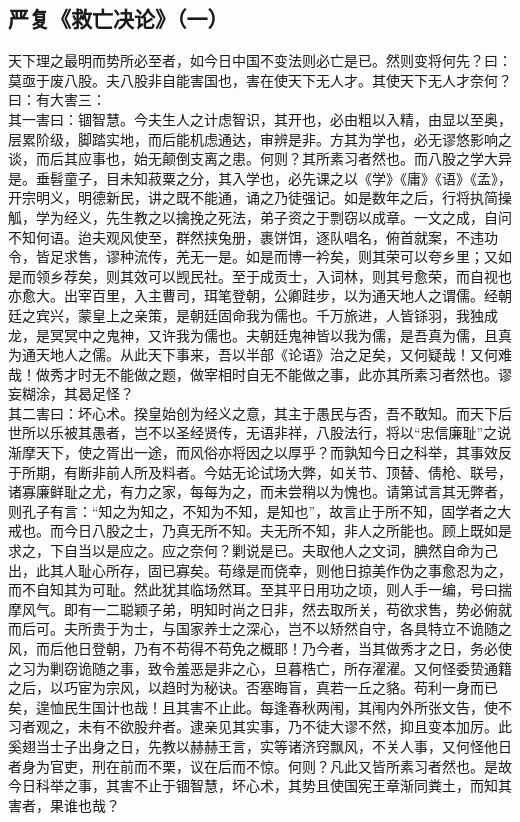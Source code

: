 \documentclass[letterpaper, 12pt]{article}
\begin{document}
\begin{multicols}{2}
\section{严复《救亡决论》（一）}
天下理之最明而势所必至者，如今日中国不变法则必亡是已。然则变将何先？曰：莫亟于废八股。夫八股非自能害国也，害在使天下无人才。其使天下无人才奈何？曰：有大害三：\\

其一害曰：锢智慧。今夫生人之计虑智识，其开也，必由粗以入精，由显以至奥，层累阶级，脚踏实地，而后能机虑通达，审辨是非。方其为学也，必无谬悠影响之谈，而后其应事也，始无颠倒支离之患。何则？其所素习者然也。而八股之学大异是。垂髫童子，目未知菽粟之分，其入学也，必先课之以《学》《庸》《语》《孟》，开宗明义，明德新民，讲之既不能通，诵之乃徒强记。如是数年之后，行将执简操觚，学为经义，先生教之以擒挽之死法，弟子资之于剽窃以成章。一文之成，自问不知何语。迨夫观风使至，群然挟兔册，裹饼饵，逐队唱名，俯首就案，不违功令，皆足求售，谬种流传，羌无一是。如是而博一衿矣，则其荣可以夸乡里；又如是而领乡荐矣，则其效可以觊民社。至于成贡士，入词林，则其号愈荣，而自视也亦愈大。出宰百里，入主曹司，珥笔登朝，公卿跬步，以为通天地人之谓儒。经朝廷之宾兴，蒙皇上之亲策，是朝廷固命我为儒也。千万旅进，人皆铩羽，我独成龙，是冥冥中之鬼神，又许我为儒也。夫朝廷鬼神皆以我为儒，是吾真为儒，且真为通天地人之儒。从此天下事来，吾以半部《论语》治之足矣，又何疑哉！又何难哉！做秀才时无不能做之题，做宰相时自无不能做之事，此亦其所素习者然也。谬妄糊涂，其曷足怪？\\

其二害曰：坏心术。揆皇始创为经义之意，其主于愚民与否，吾不敢知。而天下后世所以乐被其愚者，岂不以圣经贤传，无语非祥，八股法行，将以“忠信廉耻”之说渐摩天下，使之胥出一途，而风俗亦将因之以厚乎？而孰知今日之科举，其事效反于所期，有断非前人所及料者。今姑无论试场大弊，如关节、顶替、倩枪、联号，诸寡廉鲜耻之尤，有力之家，每每为之，而未尝稍以为愧也。请第试言其无弊者，则孔子有言：“知之为知之，不知为不知，是知也”，故言止于所不知，固学者之大戒也。而今日八股之士，乃真无所不知。夫无所不知，非人之所能也。顾上既如是求之，下自当以是应之。应之奈何？剿说是已。夫取他人之文词，腆然自命为己出，此其人耻心所存，固已寡矣。苟缘是而侥幸，则他日掠美作伪之事愈忍为之，而不自知其为可耻。然此犹其临场然耳。至其平日用功之顷，则人手一编，号曰揣摩风气。即有一二聪颖子弟，明知时尚之日非，然去取所关，苟欲求售，势必俯就而后可。夫所贵于为士，与国家养士之深心，岂不以矫然自守，各具特立不诡随之风，而后他日登朝，乃有不苟得不苟免之概耶！乃今者，当其做秀才之日，务必使之习为剿窃诡随之事，致令羞恶是非之心，旦暮梏亡，所存濯濯。又何怪委贽通籍之后，以巧宦为宗风，以趋时为秘诀。否塞晦盲，真若一丘之貉。苟利一身而已矣，遑恤民生国计也哉！且其害不止此。每逢春秋两闱，其闱内外所张文告，使不习者观之，未有不欲股弁者。逮亲见其实事，乃不徒大谬不然，抑且变本加厉。此奚翅当士子出身之日，先教以赫赫王言，实等诸济窍飘风，不关人事，又何怪他日者身为官吏，刑在前而不栗，议在后而不惊。何则？凡此又皆所素习者然也。是故今日科举之事，其害不止于锢智慧，坏心术，其势且使国宪王章渐同粪土，而知其害者，果谁也哉？\\


\end{multicols}
\end{document}
